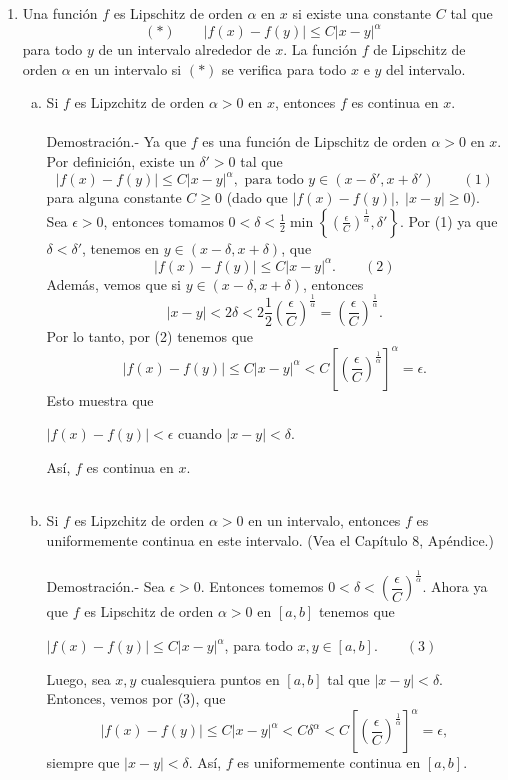 \begin{enumerate}[\bfseries 1.]
    \item Una función $f$ es Lipschitz de orden $\alpha$ en $x$ si existe una constante $C$ tal que
    $$(*)\qquad |f(x)-f(y)|\leq C|x-y|^\alpha$$
    para todo $y$ de un intervalo alrededor de $x$. La función $f$ de Lipschitz de orden $\alpha$ en un intervalo si $(*)$ se verifica para todo $x$ e $y$ del intervalo.
	\begin{enumerate}[(a)]

	    \item Si $f$ es Lipzchitz de orden $\alpha>0$ en $x$, entonces $f$ es continua en $x$.\\\\
		Demostración.-\; Ya que $f$ es una función de Lipschitz de orden $\alpha>0$ en $x$. Por definición, existe un $\delta'>0$ tal que 
		$$|f(x)-f(y)|\leq C|x-y|^\alpha, \mbox{ para todo } y \in (x-\delta',x+\delta')\qquad (1)$$
		para alguna constante $C\geq 0$ (dado que $|f(x)-f(y)|,\;|x-y|\geq 0$). Sea $\epsilon>0$, entonces tomamos $0<\delta<\frac{1}{2}\min\left\{\left(\frac{\epsilon}{C}\right)^{\frac{1}{\alpha}},\delta'\right\}$. Por (1) ya que $\delta<\delta'$, tenemos en $y\in(x-\delta,x+\delta)$, que
		$$|f(x)-f(y)|\leq C|x-y|^{\alpha}. \qquad (2)$$
		Además, vemos que si $y\in (x-\delta,x+\delta)$, entonces
		$$|x-y|<2\delta<2\dfrac{1}{2}\left(\dfrac{\epsilon}{C}\right)^{\frac{1}{\alpha}}=\left(\dfrac{\epsilon}{C}\right)^{\frac{1}{\alpha}}.$$
		Por lo tanto, por (2) tenemos que
		$$|f(x)-f(y)|\leq C |x-y|^{\alpha}<C\left[\left(\dfrac{\epsilon}{C}\right)^{\frac{1}{\alpha}}\right]^\alpha = \epsilon.$$
		Esto muestra que
		\begin{center}
		    $|f(x)-f(y)|<\epsilon$ cuando $|x-y|<\delta$.
		\end{center}
		Así, $f$ es continua en $x$.\\\\


	    \item Si $f$ es Lipzchitz de orden $\alpha>0$ en un intervalo, entonces $f$ es uniformemente continua en este intervalo. (Vea el Capítulo 8, Apéndice.)\\\\
		Demostración.-\; Sea $\epsilon>0$. Entonces tomemos $0<\delta<\left(\dfrac{\epsilon}{C}\right)^{\frac{1}{\alpha}}$. Ahora ya que $f$ es Lipschitz de orden $\alpha>0$ en $[a,b]$ tenemos que 
		\begin{center}
		    $|f(x)-f(y)|\leq C|x-y|^\alpha$, para todo $x,y\in [a,b]. \qquad (3)$
		\end{center}
		Luego, sea $x,y$ cualesquiera puntos en $[a,b]$ tal que $|x-y|<\delta$. Entonces, vemos por (3), que
		$$|f(x)-f(y)|\leq C|x-y|^{\alpha}<C\delta^\alpha<C\left[\left(\dfrac{\epsilon}{C}\right)^{\frac{1}{\alpha}}\right]^\alpha=\epsilon,$$
		siempre que $|x-y|<\delta$. Así, $f$ es uniformemente continua en $[a,b]$.\\\\


\end{enumerate}
\end{enumerate}

